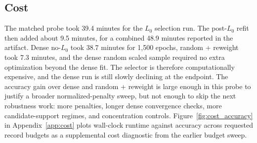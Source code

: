 \subsection{Cost}

The matched probe took 39.4 minutes for the $L_0$ selection run. The post-$L_0$ refit then added about
9.5 minutes, for a combined 48.9 minutes reported in the artifact. Dense no-$L_0$ took 38.7 minutes for
1{,}500 epochs, random + reweight took 7.3 minutes, and the dense random scaled sample required no extra
optimization beyond the dense fit. The selector is therefore computationally expensive, and the dense run
is still slowly declining at the endpoint. The accuracy gain over dense and random + reweight is large
enough in this probe to justify a broader normalized-penalty sweep, but not enough to skip the next
robustness work: more penalties, longer dense convergence checks, more candidate-support regimes, and
concentration controls. Figure~\ref{fig:cost_accuracy} in Appendix~\ref{app:cost} plots wall-clock
runtime against accuracy across requested record budgets as a supplemental cost diagnostic from the
earlier budget sweep.
